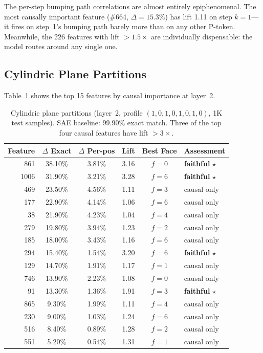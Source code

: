\documentclass[10pt]{article}
\begin{document}
The per-step bumping path correlations are almost entirely epiphenomenal. The
most causally important feature (\#664, $\Delta = 15.3\%$) has lift 1.11 on
step $k{=}1$---it fires on step~1's bumping path barely more than on any
other P-token. Meanwhile, the 226 features with lift $> 1.5\times$ are
individually dispensable: the model routes around any single one.

\subsection{Cylindric Plane Partitions}

Table~\ref{tab:cyl} shows the top 15 features by causal importance at
layer~2.

\begin{table}[h]
\centering
\caption{Cylindric plane partitions (layer~2, profile $(1,0,1,0,1,0,1,0)$,
1K test samples). SAE baseline: 99.90\% exact match. Three of the top four
causal features have lift $> 3\times$.}
\label{tab:cyl}
\small
\begin{tabular}{rccccl}
\toprule
Feature & $\Delta$ Exact & $\Delta$ Per-pos & Lift & Best Face & Assessment \\
\midrule
861 & 38.10\% & 3.81\% & 3.16 & $f{=}0$ & \textbf{faithful} $\star$ \\
1006 & 31.90\% & 3.21\% & 3.28 & $f{=}6$ & \textbf{faithful} $\star$ \\
469 & 23.50\% & 4.56\% & 1.11 & $f{=}3$ & causal only \\
177 & 22.90\% & 4.14\% & 1.06 & $f{=}6$ & causal only \\
 38 & 21.90\% & 4.23\% & 1.04 & $f{=}4$ & causal only \\
279 & 19.80\% & 3.94\% & 1.23 & $f{=}2$ & causal only \\
185 & 18.00\% & 3.43\% & 1.16 & $f{=}6$ & causal only \\
294 & 15.40\% & 1.54\% & 3.20 & $f{=}6$ & \textbf{faithful} $\star$ \\
129 & 14.70\% & 1.91\% & 1.17 & $f{=}1$ & causal only \\
746 & 13.90\% & 2.23\% & 1.08 & $f{=}0$ & causal only \\
 91 & 13.30\% & 1.36\% & 1.91 & $f{=}3$ & \textbf{faithful} $\star$ \\
865 &  9.30\% & 1.99\% & 1.11 & $f{=}4$ & causal only \\
230 &  9.00\% & 1.03\% & 1.24 & $f{=}6$ & causal only \\
516 &  8.40\% & 0.89\% & 1.28 & $f{=}2$ & causal only \\
551 &  5.20\% & 0.54\% & 1.31 & $f{=}1$ & causal only \\
\bottomrule
\end{tabular}
\end{table}
\end{document}
